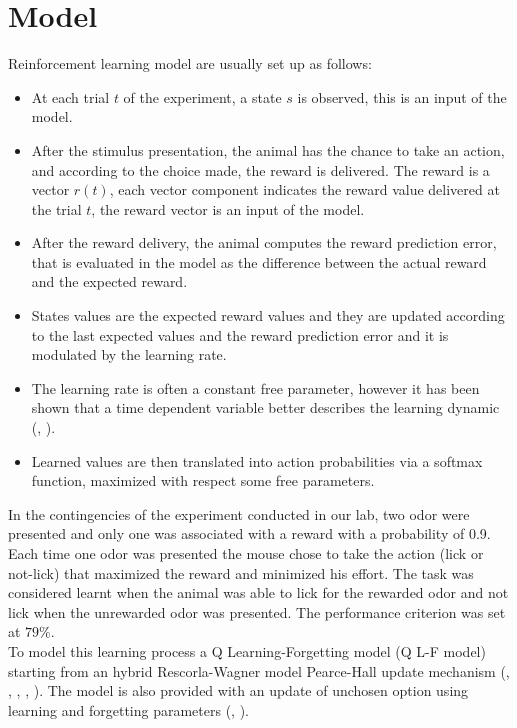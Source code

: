 \section{Model}
\label{sec:Model}
Reinforcement learning model are usually set up as follows:
\begin{itemize}
    \item At each trial $t$ of the experiment, a state $s$ is observed, this is an input of the model.
    \item After the stimulus presentation, the animal has the chance to take an action, and according to the choice made, the reward is delivered. The reward is a vector $r(t)$, each vector component indicates the reward value delivered at the trial $t$, the reward vector is an input of the model.
    \item After the reward delivery, the animal computes the reward prediction error, that is evaluated in the model as the difference between the actual reward and the expected reward.
    \item States values are the expected reward values and they are updated according to the last expected values and the reward prediction error and it is modulated by the learning rate.
    \item The learning rate is often a constant free parameter, however it has been shown that a time dependent variable better describes the learning dynamic (\cite{Funamizu}, \cite{Daw}).
    \item Learned values are then translated into action probabilities via a softmax function, maximized with respect some free parameters.
\end{itemize}
In the contingencies of the experiment conducted in our lab, two odor were presented and only one was associated with a reward with a probability of 0.9. Each time one odor was presented the mouse chose to take the action (lick or not-lick) that maximized the reward and minimized his effort. The task was considered learnt when the animal was able to lick for the rewarded odor and not lick when the unrewarded odor was presented. The performance criterion was set at $79\%$.\\To model this learning process a Q Learning-Forgetting model (Q L-F model) starting from an hybrid Rescorla-Wagner model Pearce-Hall update mechanism (\cite{RescorlaWagner}, \cite{PearceHall}, \cite{Li}, \cite{Costa}, \cite{Koppe}). The model is also provided with an update of unchosen option using learning and forgetting parameters (\cite{ItoDoya1}, \cite{Katahira}).
